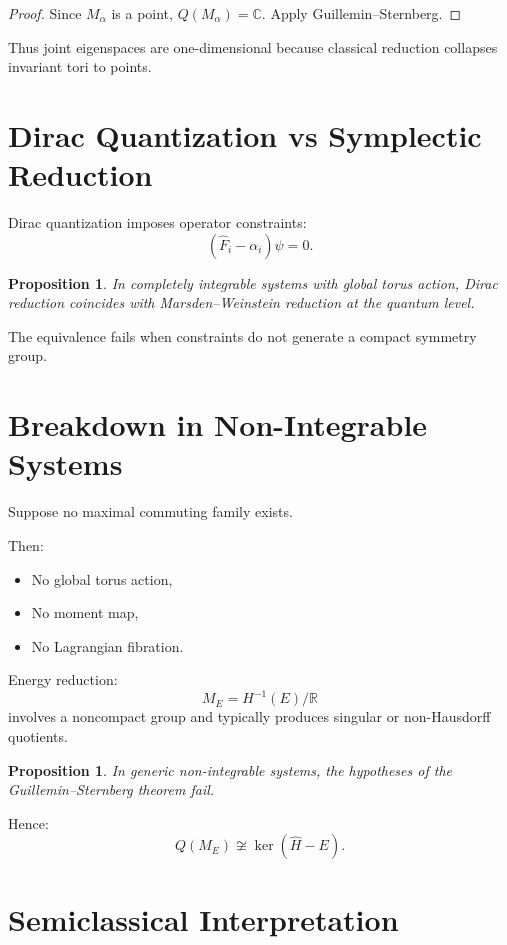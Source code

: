 \documentclass[11pt]{article}
\newtheorem{proposition}[theorem]{Proposition}
\begin{document}
\begin{proof}
Since $M_\alpha$ is a point, $Q(M_\alpha)=\mathbb{C}$. Apply Guillemin--Sternberg.
\end{proof}

Thus joint eigenspaces are one-dimensional because classical reduction collapses invariant tori to points.

\section{Dirac Quantization vs Symplectic Reduction}

Dirac quantization imposes operator constraints:
\[
(\hat F_i - \alpha_i)\psi=0.
\]

\begin{proposition}
In completely integrable systems with global torus action, Dirac reduction coincides with Marsden--Weinstein reduction at the quantum level.
\end{proposition}

The equivalence fails when constraints do not generate a compact symmetry group.

\section{Breakdown in Non-Integrable Systems}

Suppose no maximal commuting family exists.

Then:

\begin{itemize}
\item No global torus action,
\item No moment map,
\item No Lagrangian fibration.
\end{itemize}

Energy reduction:
\[
M_E = H^{-1}(E)/\mathbb{R}
\]
involves a noncompact group and typically produces singular or non-Hausdorff quotients.

\begin{proposition}
In generic non-integrable systems, the hypotheses of the Guillemin--Sternberg theorem fail.
\end{proposition}

Hence:
\[
Q(M_E) \not\cong \ker(\hat H - E).
\]

\section{Semiclassical Interpretation}
\end{document}
